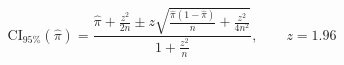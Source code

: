 \begin{equation}
\text{CI}_{95\%}(\hat{\pi}) = \frac{\hat{\pi} + \frac{z^2}{2n} \pm z\sqrt{\frac{\hat{\pi}(1-\hat{\pi})}{n} + \frac{z^2}{4n^2}}}{1 + \frac{z^2}{n}},
\qquad z = 1.96
\end{equation}
